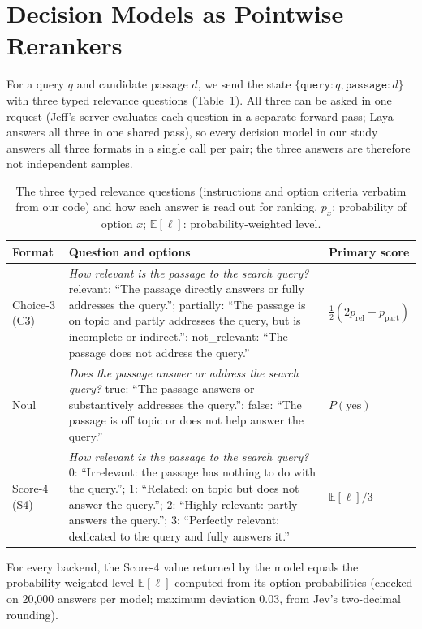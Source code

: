 \section{Decision Models as Pointwise Rerankers}

For a query $q$ and candidate passage $d$, we send the state $\{\texttt{query}: q, \texttt{passage}: d\}$ with three typed relevance questions (Table~\ref{tab:questions}).
All three can be asked in one request (Jeff\kern0pt's server evaluates each question in a separate forward pass; Laya answers all three in one shared pass), so every decision model in our study answers all three formats in a single call per pair; the three answers are therefore not independent samples.

\begin{table}[t]
\centering
\footnotesize
\setlength{\tabcolsep}{3pt}
\caption{The three typed relevance questions (instructions and option criteria verbatim from our code) and how each answer is read out for ranking. $p_x$: probability of option $x$; $\mathbb{E}[\ell]$: probability-weighted level.}
\label{tab:questions}
\begin{tabular}{p{0.9cm}p{4.7cm}p{2.1cm}}
\toprule
Format & Question and options & Primary score \\
\midrule
Choice-3 (C3) & \emph{How relevant is the passage to the search query?} relevant: ``The passage directly answers or fully addresses the query.''; partially: ``The passage is on topic and partly addresses the query, but is incomplete or indirect.''; not\_relevant: ``The passage does not address the query.'' & $\tfrac{1}{2}(2p_\text{rel}+p_\text{part})$ \\
\addlinespace[2pt]
Noul & \emph{Does the passage answer or address the search query?} true: ``The passage answers or substantively addresses the query.''; false: ``The passage is off topic or does not help answer the query.'' & $P(\text{yes})$ \\
\addlinespace[2pt]
Score-4 (S4) & \emph{How relevant is the passage to the search query?} 0: ``Irrelevant: the passage has nothing to do with the query.''; 1: ``Related: on topic but does not answer the query.''; 2: ``Highly relevant: partly answers the query.''; 3: ``Perfectly relevant: dedicated to the query and fully answers it.'' & $\mathbb{E}[\ell]/3$ \\
\bottomrule
\end{tabular}
\end{table}

For every backend, the Score-4 value returned by the model equals the probability-weighted level $\mathbb{E}[\ell]$ computed from its option probabilities (checked on 20{,}000 answers per model; maximum deviation 0.03, from Jev's two-decimal rounding).

